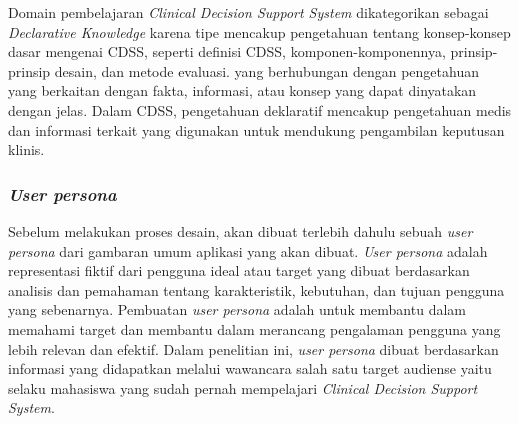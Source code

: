 Domain pembelajaran \textit{Clinical Decision Support System} dikategorikan sebagai \textit{Declarative Knowledge} karena tipe  mencakup pengetahuan tentang konsep-konsep dasar mengenai CDSS, seperti definisi CDSS, komponen-komponennya, prinsip-prinsip desain, dan metode evaluasi.
yang berhubungan dengan pengetahuan yang berkaitan dengan fakta, informasi, atau konsep yang dapat dinyatakan dengan jelas. Dalam CDSS, pengetahuan deklaratif mencakup pengetahuan medis dan informasi terkait yang digunakan untuk mendukung pengambilan keputusan klinis.
\subsubsection{\textit{User persona}}
Sebelum melakukan proses desain, akan dibuat terlebih dahulu sebuah \textit{user persona} dari gambaran umum aplikasi yang akan dibuat.
\textit{User persona} adalah representasi fiktif dari pengguna ideal atau target yang dibuat berdasarkan analisis dan pemahaman tentang karakteristik, kebutuhan, dan tujuan pengguna yang sebenarnya. 
Pembuatan \textit{user persona} adalah untuk membantu dalam memahami target dan membantu dalam merancang pengalaman pengguna yang lebih relevan dan efektif.
Dalam penelitian ini, \textit{user persona} dibuat berdasarkan informasi yang didapatkan melalui wawancara salah satu target audiense yaitu selaku mahasiswa yang sudah pernah mempelajari \textit{Clinical Decision Support System}.

